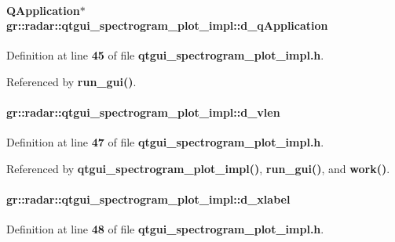 \paragraph[{d\+\_\+q\+Application}]{\setlength{\rightskip}{0pt plus 5cm}Q\+Application$\ast$ gr\+::radar\+::qtgui\+\_\+spectrogram\+\_\+plot\+\_\+impl\+::d\+\_\+q\+Application}\label{classgr_1_1radar_1_1qtgui__spectrogram__plot__impl_a6dbdce2acdc4715804c5b2a731d9fd70}


Definition at line {\bf 45} of file {\bf qtgui\+\_\+spectrogram\+\_\+plot\+\_\+impl.\+h}.



Referenced by {\bf run\+\_\+gui()}.

\paragraph[{d\+\_\+vlen}]{ gr\+::radar\+::qtgui\+\_\+spectrogram\+\_\+plot\+\_\+impl\+::d\+\_\+vlen}\label{classgr_1_1radar_1_1qtgui__spectrogram__plot__impl_abd6fe7898717cc7c30de87b1a33d5d8a}


Definition at line {\bf 47} of file {\bf qtgui\+\_\+spectrogram\+\_\+plot\+\_\+impl.\+h}.



Referenced by {\bf qtgui\+\_\+spectrogram\+\_\+plot\+\_\+impl()}, {\bf run\+\_\+gui()}, and {\bf work()}.

\paragraph[{d\+\_\+xlabel}]{ gr\+::radar\+::qtgui\+\_\+spectrogram\+\_\+plot\+\_\+impl\+::d\+\_\+xlabel}\label{classgr_1_1radar_1_1qtgui__spectrogram__plot__impl_a70738e4c7f3a6ed2f42ee45606fbc24a}


Definition at line {\bf 48} of file {\bf qtgui\+\_\+spectrogram\+\_\+plot\+\_\+impl.\+h}.



